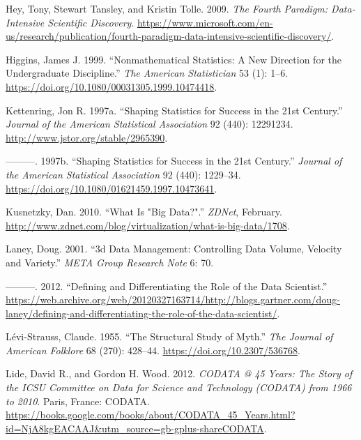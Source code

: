 \documentclass[
  letterpaper,
]{report}
\newlength{\cslhangindent}
\newlength{\cslentryspacingunit} %
\newenvironment{CSLReferences}[2] %
 {%
  \setlength{\parindent}{0pt}
  \ifodd #1
  \let\oldpar\par
  \def\par{\hangindent=\cslhangindent\oldpar}
  \fi
  \setlength{\parskip}{#2\cslentryspacingunit}
 }%
 {}
\begin{document}
\begin{CSLReferences}{1}{0}
\leavevmode{}%
Hey, Tony, Stewart Tansley, and Kristin Tolle. 2009. \emph{The Fourth
Paradigm: Data-Intensive Scientific Discovery}.
\url{https://www.microsoft.com/en-us/research/publication/fourth-paradigm-data-intensive-scientific-discovery/}.

\leavevmode{}%
Higgins, James J. 1999. {``Nonmathematical Statistics: A New Direction
for the Undergraduate Discipline.''} \emph{The American Statistician} 53
(1): 1--6. \url{https://doi.org/10.1080/00031305.1999.10474418}.

\leavevmode{}%
Kettenring, Jon R. 1997a. {``Shaping Statistics for Success in the 21st
Century.''} \emph{Journal of the American Statistical Association} 92
(440): 12291234. \url{http://www.jstor.org/stable/2965390}.

\leavevmode{}%
---------. 1997b. {``Shaping Statistics for Success in the 21st
Century.''} \emph{Journal of the American Statistical Association} 92
(440): 1229--34. \url{https://doi.org/10.1080/01621459.1997.10473641}.

\leavevmode{}%
Kusnetzky, Dan. 2010. {``What Is {"}Big Data?{"}.''} \emph{ZDNet},
February.
\url{http://www.zdnet.com/blog/virtualization/what-is-big-data/1708}.

\leavevmode{}%
Laney, Doug. 2001. {``3d Data Management: Controlling Data Volume,
Velocity and Variety.''} \emph{META Group Research Note} 6: 70.

\leavevmode{}%
---------. 2012. {``Defining and Differentiating the Role of the Data
Scientist.''}
\url{https://web.archive.org/web/20120327163714/http://blogs.gartner.com/doug-laney/defining-and-differentiating-the-role-of-the-data-scientist/}.

\leavevmode{}%
Lévi-Strauss, Claude. 1955. {``The Structural Study of Myth.''}
\emph{The Journal of American Folklore} 68 (270): 428--44.
\url{https://doi.org/10.2307/536768}.

\leavevmode{}%
Lide, David R., and Gordon H. Wood. 2012. \emph{CODATA @ 45 Years: The
Story of the ICSU Committee on Data for Science and Technology (CODATA)
from 1966 to 2010}. Paris, France: CODATA.
\url{https://books.google.com/books/about/CODATA_45_Years.html?id=NjA8kgEACAAJ\&utm_source=gb-gplus-shareCODATA}.


\end{CSLReferences}
\end{document}
